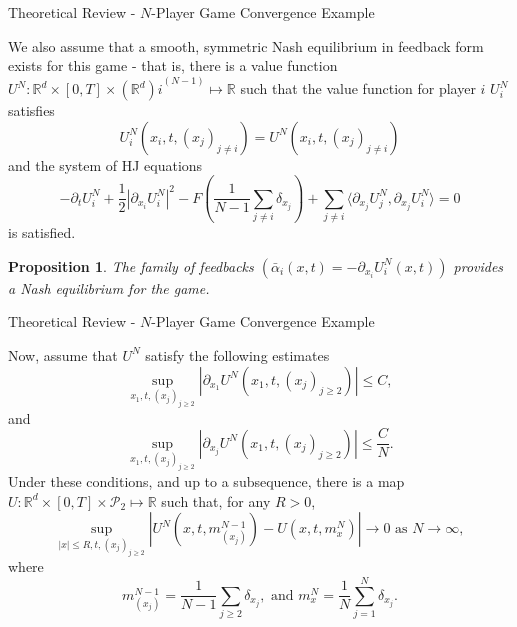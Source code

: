 \documentclass{beamer}
\newtheorem{proposition}{Proposition}
\newcommand{\RR}[0]{\mathbb{R}}
\begin{document}
{\begin{frame}{Theoretical Review - $N$-Player Game Convergence Example}

We also assume that a smooth, symmetric Nash equilibrium in feedback form exists for
this game - that is, there is a value function
$U^N : \RR^d \times [0,T] \times {(\RR^d)i}^{(N-1)} \mapsto \RR$ such that
the value function for player $i$ $U^N_i$ satisfies
\begin{equation}
    U^N_i(x_i, t, {(x_j)}_{j\neq i}) = U^N(x_i, t, {(x_j)}_{j\neq i})
\end{equation}
and the system of HJ equations
\begin{equation}
    -\partial_t U_i^N + \frac{1}{2}|\partial_{x_i} U_i^N|^2 - F\left( \frac{1}{N-1}  \sum_{j\neq i} \delta_{x_j} \right) + \sum_{j \neq i} \langle \partial_{x_j} U^N_j, \partial_{x_j} U^N_i \rangle = 0
\end{equation}
is satisfied. 
\begin{proposition}
The family of feedbacks $({\bar\alpha}_i(x,t) = - \partial_{x_i} U^N_i (x,t))$
provides a Nash equilibrium for the game.
\end{proposition}

\end{frame}

\begin{frame}{Theoretical Review - $N$-Player Game Convergence Example}

Now, assume that $U^N$ satisfy the following estimates
\begin{equation}
    \sup_{x_1, t, {(x_j)}_{j \geq 2}} \left| \partial_{x_1} U^N (x_1, t, {(x_j)}_{j \geq 2}) \right| \leq C,
\end{equation}
and
\begin{equation}
    \sup_{x_1, t, {(x_j)}_{j \geq 2}} \left| \partial_{x_j} U^N (x_1, t, {(x_j)}_{j \geq 2}) \right| \leq  \frac{C}{N}.
\end{equation}
Under these conditions, and up to a subsequence, there is a map 
$U : \RR^d \times [0,T] \times \mathcal{P}_2 \mapsto \RR$ such that,
for any $R > 0$,
\begin{equation}
    \sup_{|x| \leq R, t, {(x_j)}_{j\geq 2}} | U^N(x,t,m^{N-1}_{(x_j)}) - U(x,t,m^N_x) | \to 0\text{ as } N \to \infty,
\end{equation}
where
\begin{equation}
    m^{N-1}_{(x_j)} = \frac{1}{N-1} \sum_{j \geq 2} \delta_{x_j}, \text{ and } m^N_x = \frac{1}{N} \sum_{j = 1}^N \delta_{x_j}.
\end{equation}


\end{frame}}
\end{document}

